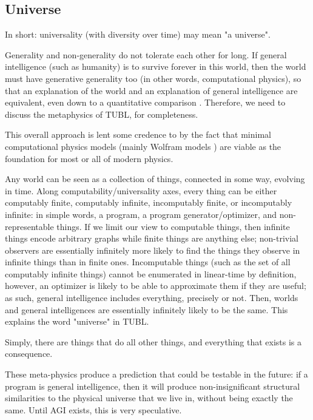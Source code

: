 \documentclass{article}
\begin{document}
\subsection{Universe}

In short: universality (with diversity over time) may mean "a universe".

Generality and non-generality do not tolerate each other for long. If general intelligence (such as humanity) is to survive forever in this world, then the world must have generative generality too (in other words, computational physics), so that an explanation of the world and an explanation of general intelligence are equivalent, even down to a quantitative comparison \cite{10.3389/fphy.2020.525731}. Therefore, we need to discuss the metaphysics of TUBL, for completeness.

This overall approach is lent some credence to by the fact that minimal computational physics models (mainly Wolfram models \cite{Wolfram_2020}) are viable as the foundation for most or all of modern physics.

Any world can be seen as a collection of things, connected in some way, evolving in time. Along computability/universality axes, every thing can be either computably finite, computably infinite, incomputably finite, or incomputably infinite: in simple words, a program, a program generator/optimizer, and non-representable things. If we limit our view to computable things, then infinite things encode arbitrary graphs while finite things are anything else; non-trivial observers are essentially infinitely more likely to find the things they observe in infinite things than in finite ones. Incomputable things (such as the set of all computably infinite things) cannot be enumerated in linear-time by definition, however, an optimizer is likely to be able to approximate them if they are useful; as such, general intelligence includes everything, precisely or not. Then, worlds and general intelligences are essentially infinitely likely to be the same. This explains the word "universe" in TUBL.

Simply, there are things that do all other things, and everything that exists is a consequence.

These meta-physics produce a prediction that could be testable in the future: if a program is general intelligence, then it will produce non-insignificant structural similarities to the physical universe that we live in, without being exactly the same. Until AGI exists, this is very speculative.
\end{document}
